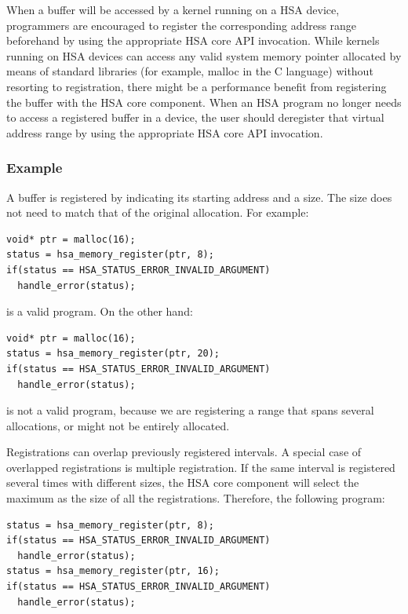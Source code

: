 \documentclass[final]{book}
\begin{document}
When a buffer will be accessed by a kernel running on a HSA device, programmers
are encouraged to register the corresponding address range beforehand by using
the appropriate HSA core API invocation. While kernels running on HSA devices
can access any valid system memory pointer allocated by means of standard
libraries (for example, malloc in the C language) without resorting to
registration, there might be a performance benefit from registering the buffer
with the HSA core component. When an HSA program no longer needs to access a
registered buffer in a device, the user should deregister that virtual address
range by using the appropriate HSA core API invocation.



\hypertarget{registration-usage}{}\subsubsection{Example}\label{registration-usage}

A buffer is registered by indicating its starting address and a size. The size
does not need to match that of the original allocation. For example:

\begin{lstlisting}
void* ptr = malloc(16);
status = hsa_memory_register(ptr, 8);
if(status == HSA_STATUS_ERROR_INVALID_ARGUMENT)
  handle_error(status);
\end{lstlisting}

 is a valid program. On the other hand:

\begin{lstlisting}
void* ptr = malloc(16);
status = hsa_memory_register(ptr, 20);
if(status == HSA_STATUS_ERROR_INVALID_ARGUMENT)
  handle_error(status);
\end{lstlisting}

is not a valid program, because we are registering a range that spans several
allocations, or might not be entirely allocated.

Registrations can overlap previously registered intervals. A special case of
overlapped registrations is multiple registration. If the same interval is
registered several times with different sizes, the HSA core component will
select the maximum as the size of all the registrations. Therefore, the
following program:

\begin{lstlisting}
status = hsa_memory_register(ptr, 8);
if(status == HSA_STATUS_ERROR_INVALID_ARGUMENT)
  handle_error(status);
status = hsa_memory_register(ptr, 16);
if(status == HSA_STATUS_ERROR_INVALID_ARGUMENT)
  handle_error(status);
\end{lstlisting}
\end{document}
